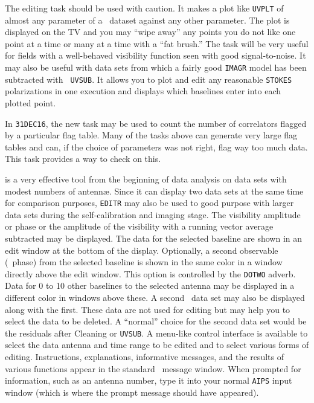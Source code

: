 The editing task {\tt {}} should be used with caution.  It
makes a plot like {\tt UVPLT} of almost any parameter of a \uv\
dataset against any other parameter.  The plot is displayed on the TV
and you may ``wipe away'' any points you do not like one point at a
time or many at a time with a ``fat brush.''  The task will be very
useful for fields with a well-behaved visibility function seen with
good signal-to-noise.  It may also be useful with data sets from which
a fairly good {\tt IMAGR} model has been subtracted with {\tt
UVSUB}\@.  It allows you to plot and edit any reasonable {\tt STOKES}
polarizations in one execution and displays which baselines enter into
each plotted point.

In {\tt 31DEC16}, the new task {\tt {}} may be used to count
the number of correlators flagged by a particular flag table.  Many of
the tasks above can generate very large flag tables and can, if the
choice of parameters was not right, flag way too much data.  This task
provides a way to check on this.


     {\tt {}} is a very effective  tool from
the beginning of data analysis on data sets with modest numbers of
antenn\ae.  Since it can display two data sets at the same time for
comparison purposes, {\tt EDITR} may also be used to good purpose with
larger data sets during the self-calibration and imaging stage.  The
visibility amplitude or phase or the amplitude of the visibility with
a running vector average subtracted may be displayed.  The data for
the selected baseline are shown in an edit window at the bottom of the
display.  Optionally, a second observable (\eg\ phase) from the
selected baseline is shown in the same color in a window directly
above the edit window.  This option is controlled by the {\tt DOTWO}
adverb.  Data for 0 to 10 other baselines to the selected antenna may
be displayed in a different color in windows above these.  A second
\uv\ data set may also be displayed along with the first.  These data
are not used for editing but may help you to select the data to be
deleted.  A ``normal'' choice for the second data set would be the
residuals after Cleaning or {\tt UVSUB}\@.  A menu-like control
interface is available to select the data antenna and time range to be
edited and to select various forms of editing.  Instructions,
explanations, informative messages, and the results of various
functions appear in the standard \AIPS\ message window.  When prompted
for information, such as an antenna number, type it into your normal
{\tt AIPS} input window (which is where the prompt message should have
appeared).

